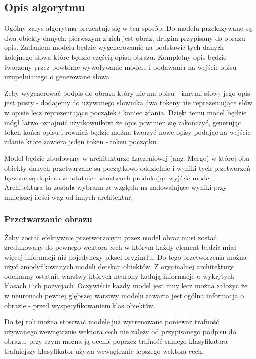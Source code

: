 \subsection{Opis algorytmu}
Ogólny zarys algorytmu prezentuje się w ten sposób: Do modelu przekazywane są dwa obiekty danych: pierwszym z nich jest obraz, drugim przypisany do obrazu opis. Zadaniem modelu będzie wygenerowanie na podstawie tych danych kolejnego słowa które będzie częścią opisu obrazu. Kompletny opis będzie tworzony przez powtórne wywoływanie modelu i podawaniu na wejście opisu uzupełnianego o generowane słowa. 

Żeby wygenerować podpis do obrazu który nie ma opisu - innymi słowy jego opis jest pusty - dodajemy do używanego słownika dwa tokeny nie reprezentujące słów w opisie lecz reprezentujące początek i koniec zdania. Dzięki temu model będzie mógł łatwo oznajmić użytkownikowi że opis powinien się zakończyć, generując token końca opisu i również będzie można tworzyć nowe opisy podając na wejście zdanie które zawiera jeden token - token początku.

Model będzie zbudowany w architekturze Łączeniowej (ang. Merge) w której oba obiekty danych przetwarzane są początkowo oddzielnie i wyniki tych przetworzeń łączone są dopiero w ostatnich warstwach produkując wyjście modelu. Architektura ta została wybrana ze względu na zadowalające wyniki przy mniejszej ilości wag od innych architektur.\cite[p.~25]{rnn-in-captiongen}
\subsubsection{Przetwarzanie obrazu}
Żeby zostać efektywnie przetworzonym przez model obraz musi zostać zredukowany do pewnego wektora cech w którym każdy element będzie miał więcej informacji niż pojedynczy piksel oryginału. Do tego przetworzenia można użyć zmodyfikowanych modeli detekcji obiektów. Z oryginalnej architektury odcinamy ostatnie warstwy których neurony kodują informacje o wykrytych klasach i ich pozycjach. Oczywiście każdy model jest inny lecz można założyć że w neuronach pewnej głębszej warstwy modelu zawarta jest ogólna informacja o obrazie - przed wyspecyfikowaniem klas obiektów.

Do tej roli można stosować modele już wytrenowane ponieważ trafność używanego wewnętrznie wektora cech nie zależy od przypisanego podpisu do obrazu, przy czym można ją ocenić poprzez trafność samego klasyfikatora - trafniejszy klasyfikator używa wewnętrznie lepszego wektora cech.

